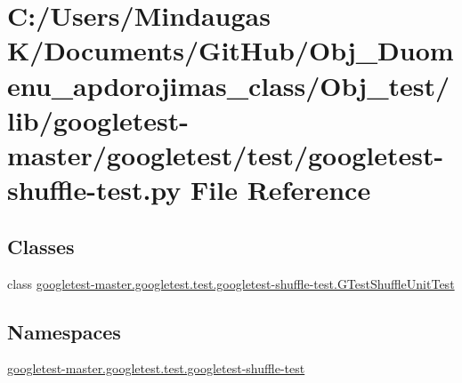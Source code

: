 \hypertarget{_obj__test_2lib_2googletest-master_2googletest_2test_2googletest-shuffle-test_8py}{}\section{C\+:/\+Users/\+Mindaugas K/\+Documents/\+Git\+Hub/\+Obj\+\_\+\+Duomenu\+\_\+apdorojimas\+\_\+class/\+Obj\+\_\+test/lib/googletest-\/master/googletest/test/googletest-\/shuffle-\/test.py File Reference}
\label{_obj__test_2lib_2googletest-master_2googletest_2test_2googletest-shuffle-test_8py}
\subsection*{Classes}
\begin{DoxyCompactItemize}
\item 
class \mbox{\hyperlink{classgoogletest-master_1_1googletest_1_1test_1_1googletest-shuffle-test_1_1_g_test_shuffle_unit_test}{googletest-\/master.\+googletest.\+test.\+googletest-\/shuffle-\/test.\+G\+Test\+Shuffle\+Unit\+Test}}
\end{DoxyCompactItemize}
\subsection*{Namespaces}
\begin{DoxyCompactItemize}
\item 
 \mbox{\hyperlink{namespacegoogletest-master_1_1googletest_1_1test_1_1googletest-shuffle-test}{googletest-\/master.\+googletest.\+test.\+googletest-\/shuffle-\/test}}
\end{DoxyCompactItemize}
